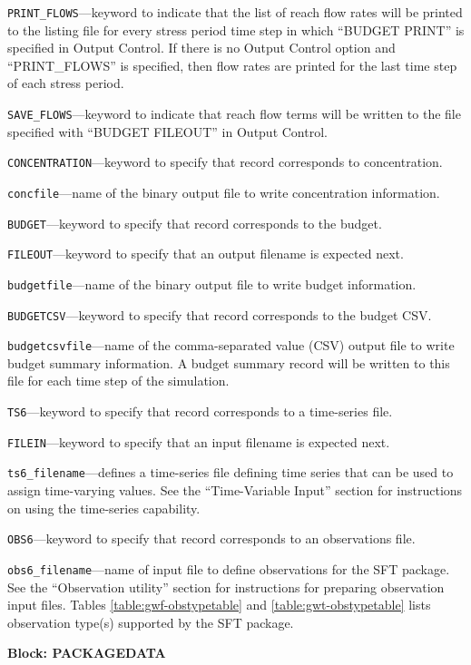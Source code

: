 \begin{description}
\item \texttt{PRINT\_FLOWS}---keyword to indicate that the list of reach flow rates will be printed to the listing file for every stress period time step in which ``BUDGET PRINT'' is specified in Output Control.  If there is no Output Control option and ``PRINT\_FLOWS'' is specified, then flow rates are printed for the last time step of each stress period.

\item \texttt{SAVE\_FLOWS}---keyword to indicate that reach flow terms will be written to the file specified with ``BUDGET FILEOUT'' in Output Control.

\item \texttt{CONCENTRATION}---keyword to specify that record corresponds to concentration.

\item \texttt{concfile}---name of the binary output file to write concentration information.

\item \texttt{BUDGET}---keyword to specify that record corresponds to the budget.

\item \texttt{FILEOUT}---keyword to specify that an output filename is expected next.

\item \texttt{budgetfile}---name of the binary output file to write budget information.

\item \texttt{BUDGETCSV}---keyword to specify that record corresponds to the budget CSV.

\item \texttt{budgetcsvfile}---name of the comma-separated value (CSV) output file to write budget summary information.  A budget summary record will be written to this file for each time step of the simulation.

\item \texttt{TS6}---keyword to specify that record corresponds to a time-series file.

\item \texttt{FILEIN}---keyword to specify that an input filename is expected next.

\item \texttt{ts6\_filename}---defines a time-series file defining time series that can be used to assign time-varying values. See the ``Time-Variable Input'' section for instructions on using the time-series capability.

\item \texttt{OBS6}---keyword to specify that record corresponds to an observations file.

\item \texttt{obs6\_filename}---name of input file to define observations for the SFT package. See the ``Observation utility'' section for instructions for preparing observation input files. Tables \ref{table:gwf-obstypetable} and \ref{table:gwt-obstypetable} lists observation type(s) supported by the SFT package.

\end{description}
\item \textbf{Block: PACKAGEDATA}

